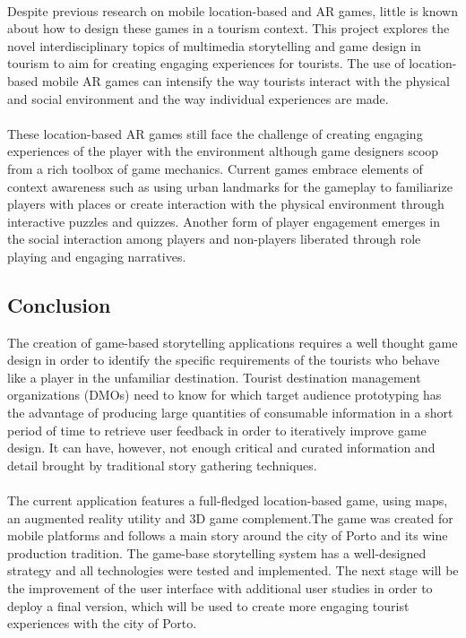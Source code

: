 \paragraph{}Despite previous research on mobile location-based and AR games, little is known about how to design these games in a tourism context. This project explores the novel interdisciplinary topics of multimedia storytelling and game design in tourism to aim for creating engaging experiences for tourists. The use of location-based mobile AR games can intensify the way tourists interact with the physical and social environment and the way individual experiences are made.
\paragraph{}These location-based AR games still face the challenge of creating engaging experiences of the player with the environment although game designers scoop from a rich toolbox of game mechanics. Current games embrace elements of context awareness such as using urban landmarks for the gameplay to familiarize players with places or create interaction with the physical environment through interactive puzzles and quizzes. Another form of player engagement emerges in the social interaction among players and non-players liberated through role playing and engaging narratives.
\subsection{Conclusion}
The creation of game-based storytelling applications requires a well thought game design in order to identify the speciﬁc requirements of the tourists who behave like a player in the unfamiliar destination. Tourist destination management organizations (DMOs) need to know for which target audience prototyping has the advantage of producing large quantities of consumable information in a short period of time to retrieve user feedback in order to iteratively improve game design. It can have, however, not enough critical and curated information and detail brought by traditional story gathering techniques. 
\paragraph{}The current application features a full-ﬂedged location-based game, using maps, an augmented reality utility and 3D game complement.The game was created for mobile platforms and follows a main story around the city of Porto and its wine production tradition. The game-base storytelling system has a well-designed strategy and all technologies were tested and implemented. The next stage will be the improvement of the user interface with additional user studies in order to deploy a ﬁnal version, which will be used to create more engaging tourist experiences with the city of Porto.
